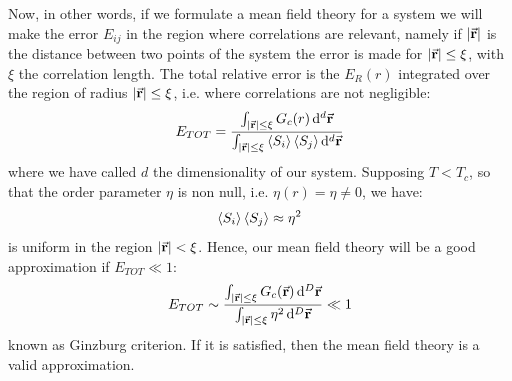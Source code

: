 \documentclass[../../Main/Main.tex]{subfiles}
\begin{document}
Now, in other words, if we formulate a mean field theory for a system we will make the error \( E_{ij} \)  in the region where correlations are relevant, namely if \( \abs{\va{r}}  \) is the distance between two points of the system the error is made for \( \abs{\va{r}} \leq \xi  \), with \( \xi  \) the correlation length.  The total relative error is the \( E_R (r)\) integrated over the region of radius \(  \abs{\va{r}} \le \xi  \), i.e. where correlations are not negligible:
\begin{equation}
  E_{TOT} = \frac{\int_{\abs{\va{r}} \le \xi  }^{} G_c (r) \dd[d]{\va{r}}  }{\int_{ \abs{\va{r}} \le \xi  }^{} \expval{S_i} \expval{S_j}  \dd[d]{\va{r}} }
\end{equation}
where we have called \( d \) the dimensionality of our system.
Supposing \( T<T_c \), so that the order parameter \( \eta  \)  is non null, i.e.  \( \eta (r) = \eta \neq 0 \), we have:
\begin{equation*}
   \expval{S_i} \expval{S_j} \approx \eta ^2
\end{equation*}
is uniform in the region \( \abs{\va{r}} < \xi   \). Hence, our mean field theory will be a good approximation if \( E_{TOT} \ll 1 \):
\begin{equation}
  E_{TOT} \sim \frac{\int_{\abs{\va{r}} \le \xi  }^{} G_c (\va{r}) \dd[D]{\va{r}}  }{\int_{ \abs{\va{r}} \le \xi  }^{ } \eta ^2 \dd[D]{\va{r}}  } \ll 1
  \label{eq:16_2}
\end{equation}
known as Ginzburg criterion. If it is satisfied, then the mean field theory is a valid approximation.
\end{document}
